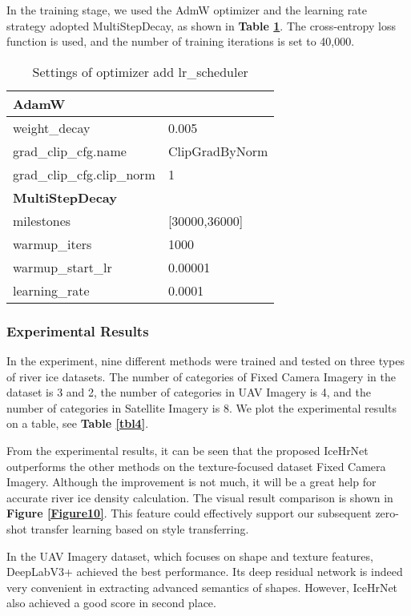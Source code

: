 \documentclass[a4paper,fleqn]{cas-dc}
\begin{document}
In the training stage, we used the AdmW optimizer and the learning rate strategy adopted MultiStepDecay, as shown in \textbf{Table \ref{tbl3}}. The cross-entropy loss function is used, and the number of training iterations is set to 40,000.

\begin{table}[h]
	\centering
	\caption{Settings of optimizer add lr\_scheduler}\label{tbl3}
	\begin{tabular*}{\tblwidth}{@{}ll@{}}
		\toprule
		\textbf{AdamW} & \\
		\midrule
		weight\_decay & 0.005 \\
		grad\_clip\_cfg.name & ClipGradByNorm \\
		grad\_clip\_cfg.clip\_norm & 1 \\
		\toprule[0.5pt]
		\textbf{MultiStepDecay} & \\
		\midrule
		milestones & [30000,36000] \\
		warmup\_iters & 1000 \\
		warmup\_start\_lr & 0.00001 \\
		learning\_rate & 0.0001 \\
		\bottomrule
	\end{tabular*}
\end{table}

\subsubsection{Experimental Results}

In the experiment, nine different methods were trained and tested on three types of river ice datasets. The number of categories of Fixed Camera Imagery in the dataset is 3 and 2, the number of categories in UAV Imagery is 4, and the number of categories in Satellite Imagery is 8. We plot the experimental results on a table, see \textbf{Table \ref{tbl4}}.

From the experimental results, it can be seen that the proposed IceHrNet outperforms the other methods on the texture-focused dataset Fixed Camera Imagery. Although the improvement is not much, it will be a great help for accurate river ice density calculation. The visual result comparison is shown in \textbf{Figure \ref{Figure10}}. This feature could effectively support our subsequent zero-shot transfer learning based on style transferring. 

In the UAV Imagery dataset, which focuses on shape and texture features, DeepLabV3+ achieved the best performance. Its deep residual network is indeed very convenient in extracting advanced semantics of shapes. However, IceHrNet also achieved a good score in second place.
\end{document}
